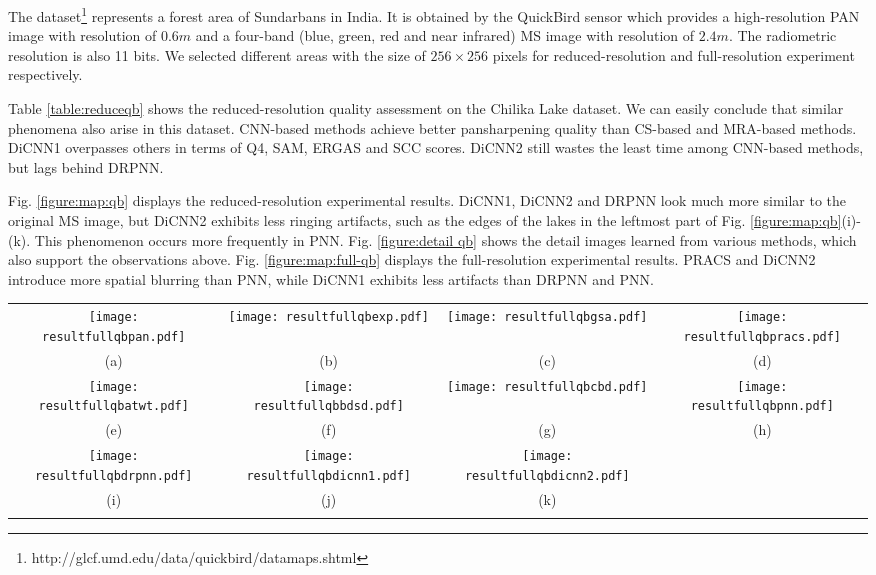 \documentclass[journal]{IEEEtran}
\begin{document}
The dataset\footnote{http://glcf.umd.edu/data/quickbird/datamaps.shtml} represents a forest area of Sundarbans in India. It is obtained by the QuickBird sensor which provides a high-resolution PAN image with resolution of $0.6m$ and a four-band (blue, green, red and near infrared) MS image with resolution of $2.4m$. The radiometric resolution is also 11 bits. We selected different areas with the size of $256\times256$ pixels for reduced-resolution and full-resolution experiment respectively.

Table \ref{table:reduceqb} shows the reduced-resolution quality assessment on the Chilika Lake dataset. We can easily conclude that similar phenomena also arise in this dataset. CNN-based methods achieve better pansharpening quality than CS-based and MRA-based methods. DiCNN1 overpasses others in terms of Q4, SAM, ERGAS and SCC scores. DiCNN2 still wastes the least time among CNN-based methods, but lags behind DRPNN.

Fig. \ref{figure:map:qb} displays the reduced-resolution experimental results. DiCNN1, DiCNN2 and DRPNN look much more similar to the original MS image, but DiCNN2 exhibits less ringing artifacts, such as the edges of the lakes in the leftmost part of Fig. \ref{figure:map:qb}(i)-(k). This phenomenon occurs more frequently in PNN. Fig. \ref{figure:detail qb} shows the detail images learned from various methods, which also support the observations above. Fig. \ref{figure:map:full-qb} displays the full-resolution experimental results. PRACS and DiCNN2 introduce more spatial blurring than PNN, while DiCNN1 exhibits less artifacts than DRPNN and PNN.

\begin{figure*}[t]\scriptsize
\centering
  \begin{tabular}{cccc}
\texttt{[image: resultfullqbpan.pdf]} &
\texttt{[image: resultfullqbexp.pdf]} &
\texttt{[image: resultfullqbgsa.pdf]} &
\texttt{[image: resultfullqbpracs.pdf]} \\
(a) & (b) & (c) & (d) \\

\texttt{[image: resultfullqbatwt.pdf]} &
\texttt{[image: resultfullqbbdsd.pdf]} &
\texttt{[image: resultfullqbcbd.pdf]} &
\texttt{[image: resultfullqbpnn.pdf]} \\
 (e) & (f) &(g) & (h)\\

\texttt{[image: resultfullqbdrpnn.pdf]} &
\texttt{[image: resultfullqbdicnn1.pdf]} &
\texttt{[image: resultfullqbdicnn2.pdf]} \\
 (i) & (j) & (k)  \\
\\
\end{tabular}
\caption{Full-resolution pansharpening results for Quickbird dataset: (a) Ground-truth; (b)EXP; (c)GSA; (d)PRACS; (e)ATWT; (f)BDSD;  (g)GLP-CBD; (h)PNN; (i)DRPNN; (j)DiCNN1; (k)DiCNN2.}
\label{figure:map:full-qb}
\end{figure*}
\end{document}
